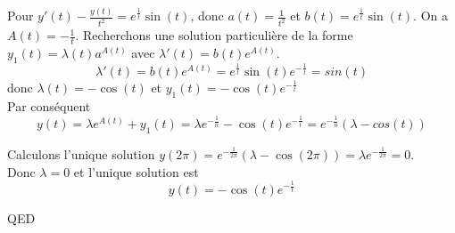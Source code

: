\documentclass[]{book}
\theoremstyle{definition}
\begin{document}
Pour $y'(t) - \frac{y(t)}{t^2} = e^{\frac{1}{t}}\sin(t)$, donc $a(t) = \frac{1}{t^2}$ et $b(t)= e^{\frac{1}{t}}\sin(t)$. On a $A(t) = -\frac{1}{t}$. Recherchons une  solution particuli\`ere de la forme $y_1(t) = \lambda(t)a^{A(t)}$ avec $\lambda'(t) = b(t)e^{A(t)}$.
$$\lambda'(t) = b(t)e^{A(t)} = e^{\frac{1}{t}}\sin(t)e^{-\frac{1}{t}} = sin(t)$$
donc $\lambda(t) =  -\cos(t)$ et $y_1(t) = -\cos(t)e^{-\frac{1}{t}}$\\
Par cons\'equent
$$y(t) = \lambda e^{A(t)}+y_1(t) = \lambda e^{-\frac{1}{n}} -\cos(t)e^{-\frac{1}{t}} = e^{-\frac{1}{n}}(\lambda-cos(t))$$

Calculons l'unique solution $y(2\pi) =  e^{-\frac{1}{2\pi}}(\lambda-\cos(2\pi)) = \lambda e^{-\frac{1}{2\pi}} = 0$.\\
Donc $\lambda = 0$ et l'unique solution est 
$$y(t) = -\cos(t)e^{-\frac{1}{t}}$$


QED
\end{document}
